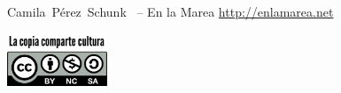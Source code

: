     \newpage
    \thispagestyle{empty}

    \begin{flushleft}\hbox{\Large{Camila Pérez Schunk}}
    \copyleft \, \the\year -- En la Marea
    \url{http://enlamarea.net}

    \vfill

    \centering
    \includegraphics[width=3cm]{assets/images/la_copia_comparte_cultura.png}

    \end{flushleft}
   \newpage
